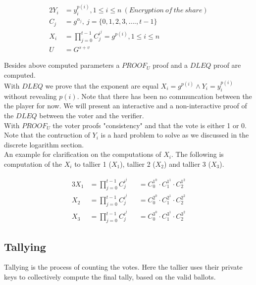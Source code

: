 \begin{alignat*}{2}
Y_i&=y_i^{p(i)} ,1\leq i\leq n \ (Encryption \ of \ the \ share) \\ 
C_j&=g^{\alpha_j},\ j =\{0,1,2,3,....,t-1 \}  \\ 
X_i&=\prod\limits_{j=0}^{t-1} C_j^{i^j} =g^{p(i)}, 1\leq i\leq n\\
U&=G^{s+v}
\end{alignat*}

\noindent
Besides above computed parameters a  $PROOF_U$ proof and a $DLEQ$ proof are computed. \\

\noindent
With $DLEQ$ we prove that the exponent are equal \begin{math}X_i=g^{p(i)}  \land Y_i=y_i^{p(i)} \end{math} without revealing \begin{math}{p(i)} \end{math}. Note that there has been no communcation between the the player for now. We will present an interactive and a non-interactive proof of the $DLEQ$ between the voter and the verifier.\\

\noindent
With \begin{math} PROOF_U \end{math} the voter proofs "consistency" and that the vote is either 1 or 0. Note that the contruction of $Y_i$ is a hard problem to solve as we discussed in the discrete logarithm section. \\

\noindent
An example for clarification on the computations of \begin{math}X_i\end{math}. The following is computation of the $X_i$ to tallier 1 ($X_1$), tallier 2 ($X_2$) and tallier 3 ($X_3$).

\begin{alignat*}{3}
X_1 &=\prod\limits_{j=0}^{t-1} C_j^{i^j} &&= C_0^{1^0}  \cdot  C_1^{1^1}  \cdot  C_2^{1^2}\\
X_2 &=\prod\limits_{j=0}^{t-1} C_j^{i^j} &&= C_0^{2^0}  \cdot  C_1^{2^1}  \cdot  C_2^{2^2}\\
X_3 &=\prod\limits_{j=0}^{t-1} C_j^{i^j} &&= C_0^{3^0}  \cdot  C_1^{3^1}  \cdot  C_2^{3^2}
\end{alignat*}


\subsection{Tallying}
Tallying is the process of counting the votes. Here the tallier uses their private keys to collectively compute the final tally, based on the valid ballots.\\


